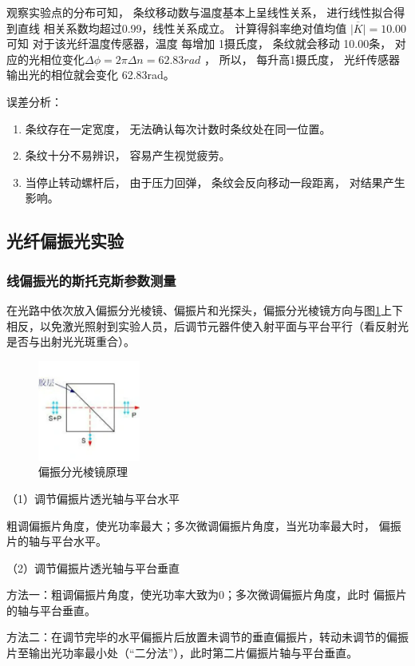 \documentclass[10pt,a4paper,twoside,UTF8]{ctexart}
\begin{document}
观察实验点的分布可知， 条纹移动数与温度基本上呈线性关系， 进行线性拟合得到直线
相关系数均超过0.99，线性关系成立。 计算得斜率绝对值均值 $\overline{|K|}=10.00 $可知 对于该光纤温度传感器，温度
每增加 1摄氏度， 条纹就会移动 10.00条， 对应的光相位变化$\varDelta \phi=2\pi \varDelta n=62.83rad$ ，
所以， 每升高1摄氏度， 光纤传感器输出光的相位就会变化 62.83rad。


误差分析：
\begin{enumerate}
	\item 条纹存在一定宽度， 无法确认每次计数时条纹处在同一位置。
	\item  条纹十分不易辨识， 容易产生视觉疲劳。
	\item 当停止转动螺杆后， 由于压力回弹， 条纹会反向移动一段距离， 对结果产生影响。
\end{enumerate}

\subsection{光纤偏振光实验}
\subsubsection{线偏振光的斯托克斯参数测量}
在光路中依次放入偏振分光棱镜、偏振片和光探头，偏振分光棱镜方向与图\ref{fig:fenguang}上下相反，以免激光照射到实验人员，后调节元器件使入射平面与平台平行（看反射光是否与出射光光斑重合）。

\begin{figure}[H]
	\centering
	\includegraphics[width=0.3\textwidth]{img//fenguang.png}
	\caption{偏振分光棱镜原理}
	\label{fig:fenguang}
\end{figure}

（1）调节偏振片透光轴与平台水平

粗调偏振片角度，使光功率最大；多次微调偏振片角度，当光功率最大时，
偏振片的轴与平台水平。

（2）调节偏振片透光轴与平台垂直

方法一：粗调偏振片角度，使光功率大致为0；多次微调偏振片角度，此时
偏振片的轴与平台垂直。

方法二：在调节完毕的水平偏振片后放置未调节的垂直偏振片，转动未调节的偏振片至输出光功率最小处（“二分法”），此时第二片偏振片轴与平台垂直。
\end{document}
